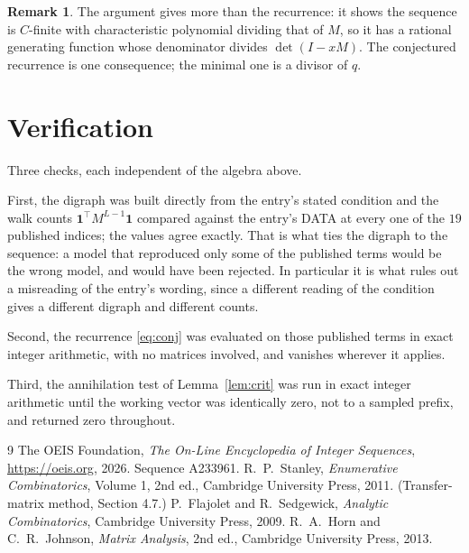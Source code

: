 \documentclass[11pt,a4paper]{article}
\theoremstyle{plain}
\theoremstyle{definition}
\newtheorem{remark}[theorem]{Remark}
\begin{document}
\begin{remark}
The argument gives more than the recurrence: it shows the sequence is $C$-finite with
characteristic polynomial dividing that of $M$, so it has a rational generating function
whose denominator divides $\det(I-xM)$. The conjectured recurrence is one consequence; the
minimal one is a divisor of $q$.
\end{remark}

\section{Verification}

Three checks, each independent of the algebra above.

First, the digraph was built directly from the entry's stated condition and the walk counts
$\mathbf{1}^{\!\top}M^{L-1}\mathbf{1}$ compared against the entry's DATA at
every one of the $19$ published indices; the values agree exactly. That is what ties
the digraph to the sequence: a model that reproduced only some of the published terms would
be the wrong model, and would have been rejected. In particular it is what rules out a
misreading of the entry's wording, since a different reading of the condition gives a
different digraph and different counts.

Second, the recurrence \eqref{eq:conj} was evaluated on those published terms in exact
integer arithmetic, with no matrices involved, and vanishes wherever it applies.

Third, the annihilation test of Lemma~\ref{lem:crit} was run in exact integer arithmetic
until the working vector was identically zero, not to a sampled prefix, and returned zero
throughout.

\begin{thebibliography}{9}
 The OEIS Foundation, \emph{The On-Line Encyclopedia of Integer
Sequences}, \url{https://oeis.org}, 2026. Sequence A233961.
 R.~P.~Stanley, \emph{Enumerative Combinatorics}, Volume 1, 2nd ed.,
Cambridge University Press, 2011. (Transfer-matrix method, Section 4.7.)
 P.~Flajolet and R.~Sedgewick, \emph{Analytic Combinatorics}, Cambridge
University Press, 2009.
 R.~A.~Horn and C.~R.~Johnson, \emph{Matrix Analysis}, 2nd ed., Cambridge
University Press, 2013.
\end{thebibliography}
\end{document}
